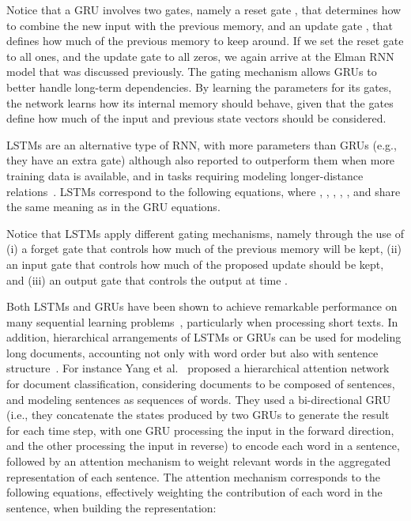 Notice that a GRU involves two gates, namely a reset gate , that determines how to combine the new input with the previous memory, and an update gate , that defines how much of the previous memory to keep around. If we set the reset gate to all ones, and the update gate to all zeros, we again arrive at the Elman RNN model that was discussed previously. The gating mechanism allows GRUs to better handle long-term dependencies. By learning the parameters for its gates, the network learns how its internal memory should behave, given that the gates define how much of the input and previous state vectors should be considered.

LSTMs are an alternative type of RNN, with more parameters than GRUs (e.g., they have an extra gate) although also reported to outperform them when more training data is available, and in tasks requiring modeling longer-distance relations~\cite{yin2017comparative}. LSTMs correspond to the following equations, where , ,  , , ,  and  share the same meaning as in the GRU equations.








Notice that LSTMs apply different gating mechanisms, namely through the use of (i) a forget gate that controls how much of the previous memory will be kept, (ii) an input gate that controls how much of the proposed update  should be kept, and (iii) an output gate that controls the output at time .

Both LSTMs and GRUs have been shown to achieve remarkable performance on many sequential learning problems~\cite{yin2017comparative}, particularly when processing short texts. In addition, hierarchical arrangements of LSTMs or GRUs can be used for modeling long documents, accounting not only with word order but also with sentence structure~\cite{hierarchical,franciscoduarte}. For instance Yang et al.~\cite{hierarchical} proposed a hierarchical attention network for document classification, considering documents to be composed of sentences, and modeling sentences as sequences of words. They used a bi-directional GRU (i.e., they concatenate the states produced by two GRUs to generate the result for each time step, with one GRU processing the input in the forward direction, and the other processing the input in reverse) to encode each word in a sentence, followed by an attention mechanism to weight relevant words in the aggregated representation of each sentence. The attention mechanism corresponds to the following equations, effectively weighting the contribution of each word in the sentence, when building the representation:



